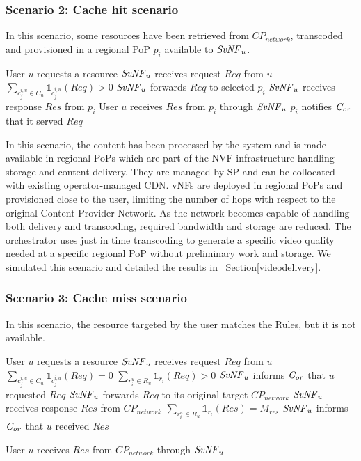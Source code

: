 \subsubsection*{Scenario 2: Cache hit scenario}

In this scenario, some resources have been retrieved from \(\mathit{CP}_{\mathit{network}}\), transcoded and provisioned in a regional PoP $p_{i}$ available to $\mathit{SvNF}_{u}$.

\begin{algorithmic}[1]
	\STATE User $u$ requests a resource
\STATE $\mathit{SvNF}_{u}$ receives request $\mathit{Req}$ from $u$
\STATE \( \sum_{c^{i,u}_{j}\in C_{u}}{\mathbb{1}_{c^{i,u}_{j}}(\mathit{Req})}>0\)
\STATE $\mathit{SvNF}_{u}$ forwards $\mathit{Req}$ to selected $p_{i}$
\STATE $\mathit{SvNF}_{u}$ receives response $\mathit{Res}$ from $p_{i}$
\STATE User $u$ receives $\mathit{Res}$ from $p_{i}$ through $\mathit{SvNF}_{u}$
\STATE $p_{i}$ notifies $\mathit{C_{or}}$ that it served  $\mathit{Req}$
\end{algorithmic}


In this scenario, the content has been processed by the system and is made available in regional PoPs which are part of the NVF infrastructure handling storage and content delivery.
They are managed by SP and can be collocated with existing operator-managed CDN.
vNFs are deployed in regional PoPs and provisioned close to the user, limiting the number of hops with respect to the original Content Provider Network.
As the network becomes capable of handling both delivery and transcoding, required bandwidth and storage are reduced. The orchestrator uses just in time transcoding to generate a specific video quality needed at a specific regional PoP without preliminary work and storage.
We simulated this scenario and detailed the results in ~Section\ref{videodelivery}.

\subsubsection*{Scenario 3: Cache miss scenario}

In this scenario, the resource targeted by the user matches the Rules, but it is not available.

\begin{algorithmic}[1]
\STATE User $u$ requests a resource
\STATE $\mathit{SvNF}_{u}$ receives request $\mathit{Req}$ from $u$
\STATE \( \sum_{c^{i,u}_{j}\in C_{u}}{\mathbb{1}_{c^{i,u}_{j}}(\mathit{Req})} = 0 \)
\STATE \( \sum_{r^{u}_{i}\in R_{u}}{\mathbb{1}_{r_{i}}(\mathit{Req})} > 0  \)
\STATE $\mathit{SvNF}_{u}$ informs $\mathit{C_{or}}$ that $u$ requested $\mathit{Req}$
\ENDIF
\STATE $\mathit{SvNF}_{u}$ forwards $\mathit{Req}$ to its original target \(\mathit{CP}_{\mathit{network}}\)
\STATE $\mathit{SvNF}_{u}$ receives response $\mathit{Res}$ from \(\mathit{CP}_{\mathit{network}}\)
	\STATE \( \sum_{r^{u}_{i}\in R_{u}}{\mathbb{1}_{r_{i}}(\mathit{Res})}=M_{res}\) 
	\STATE $\mathit{SvNF}_{u}$ informs $\mathit{C_{or}}$ that $u$ received $\mathit{Res}$
	\ENDIF
\ENDIF

 
\STATE User $u$ receives $\mathit{Res}$ from \(\mathit{CP}_{\mathit{network}}\) through $\mathit{SvNF}_{u}$
\end{algorithmic}

